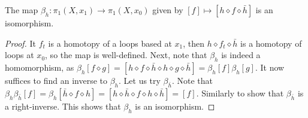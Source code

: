 \documentclass{../mathnotes}
\begin{document}
\begin{prop}
    The map $\beta_h:\pi_1(X,x_1)\to\pi_1(X,x_0)$ given by $[f]\mapsto[h\diamond f\diamond \bar h]$
    is an isomorphism.
\end{prop}
\begin{proof}
    It $f_t$ is a homotopy of a loops based at $x_1$, then $h\diamond f_t\diamond\bar h$ is a homotopy
    of loops at $x_0$, so the map is well-defined. Next, note that $\beta_h$ is indeed a homomorphism,
    as $\beta_h[f\diamond g]=[h\diamond f\diamond \bar h\diamond h\diamond g\diamond \bar h]=\beta_h[f]\beta_h[g]$.
    It now suffices to find an inverse to $\beta_h$. Let us try $\beta_{\bar h}$. Note that
    $\beta_h\beta_{\bar h}[f]=\beta_h[\bar h\diamond f\diamond h]=[h\diamond\bar h\diamond f\diamond h\diamond\bar h]=[f]$.
    Similarly to show that $\beta_{\bar h}$ is a right-inverse. This shows that $\beta_h$ is an isomorphism.
\end{proof}
\end{document}
